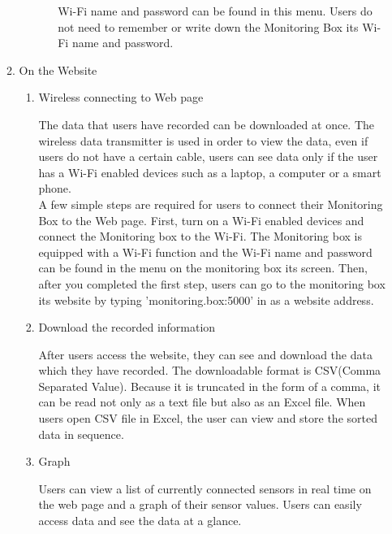 \documentclass[conference]{IEEEtran}
\begin{document}
\begin{enumerate}
\begin{enumerate}
\begin{enumerate}
\begin{enumerate}
						Wi-Fi name and password can be found in this menu. Users do not need to remember or write down the Monitoring Box its Wi-Fi name and password.\\
				\end{enumerate}
			\end{enumerate}
		\item On the Website
			\begin{enumerate}
				\item Wireless connecting to Web page

					The data that users have recorded can be downloaded at once. The wireless data transmitter is used in order to view the data, even if users do not have a certain cable, users can see data only if the user has a Wi-Fi enabled devices such as a laptop, a computer or a smart phone. \\
					A few simple steps are required for users to connect their Monitoring Box to the Web page. First, turn on a Wi-Fi enabled devices and connect the Monitoring box to the Wi-Fi. The Monitoring box is equipped with a Wi-Fi function and the Wi-Fi name and password can be found in the menu on the monitoring box its screen. Then, after you completed the first step, users can go to the monitoring box its website by typing 'monitoring.box:5000' in as a website address.\\

				\item Download the recorded information

					After users access the website, they can see and download the data which they have recorded. The downloadable format is CSV(Comma Separated Value). Because it is truncated in the form of a comma, it can be read not only as a text file but also as an Excel file. When users open CSV file in Excel, the user can view and store the sorted data in sequence.\\

				\item Graph

					Users can view a list of currently connected sensors in real time on the web page and a graph of their sensor values. Users can easily access data and see the data at a glance.\\
			\end{enumerate}
		\end{enumerate}
 	\end{enumerate}
\end{document}
